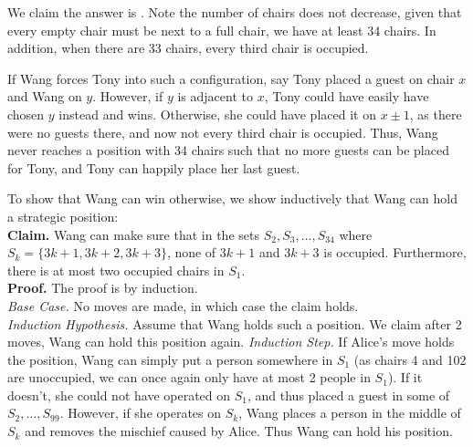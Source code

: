 \begin{solution}\hfil\medskip
 
We claim the answer is . Note the number of chairs does not decrease, given that every empty chair must be next to a full chair, we have at least 34 chairs. In addition, when there are 33 chairs, every third chair is occupied.
 
 If Wang forces Tony into such a configuration, say Tony placed a guest on chair $x$ and Wang on $y$. However, if $y$ is adjacent to $x$, Tony could have easily have chosen $y$ instead and wins. Otherwise, she could have placed it on $x\pm 1$, as there were no guests there, and now not every third chair is occupied. Thus, Wang never reaches a position with 34 chairs such that no more guests can be placed for Tony, and Tony can happily place her last guest.
 
 To show that Wang can win otherwise, we show inductively that Wang can hold a strategic position:\\
 \textbf{Claim.} Wang can make sure that in the sets $S_2,S_3,\ldots,S_{34}$ where $S_k=\{3k+1,3k+2,3k+3\}$, none of $3k+1$ and $3k+3$ is occupied. Furthermore, there is at most two occupied chairs in $S_1$.\\
 \textbf{Proof.} The proof is by induction.\\
 \textit{Base Case.} No moves are made, in which case the claim holds.\\
 \textit{Induction Hypothesis.} Assume that Wang holds such a position. We claim after 2 moves, Wang can hold this position again.
 \textit{Induction Step.} If Alice's move holds the position, Wang can simply put a person somewhere in $S_1$ (as chairs 4 and 102 are unoccupied, we can once again only have at most 2 people in $S_1$). If it doesn't, she could not have operated on $S_1$, and thus placed a guest in some of $S_2,\ldots,S_{99}$. However, if she operates on $S_k$, Wang places a person in the middle of $S_k$ and removes the mischief caused by Alice. Thus Wang can hold his position.
\end{solution}\bigskip
